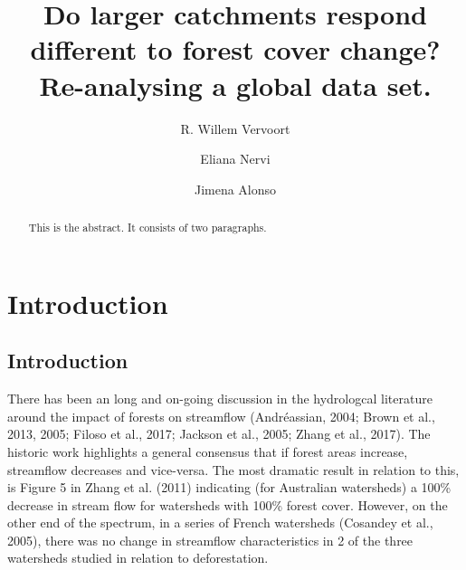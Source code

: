\documentclass[]{elsarticle} %
\begin{document}
\begin{frontmatter}

  \title{Do larger catchments respond different to forest cover change?
Re-analysing a global data set.}
    \author[The University of Sydney, INIA]{R. Willem Vervoort}
    \author[INIA]{Eliana Nervi}
    \author[IMFIA]{Jimena Alonso}
      \address[The University of Sydney]{School of Life and Environmental Sciences, The University of Sydney,
Sydney, NSW 2006, Australia}
    \address[INIA]{Instituto Nacional de Investigación Agropecuaria, INIA-Uruguay, Ruta 48
km 10, Rincon del Colorado, 90100 Canelones, Uruguay}
    \address[IMFIA]{Institute of Fluid Mechanics and Environmental Engineering, School of
Engineering, Universidad de la República, 11200 Montevideo, Uruguay}
  
  \begin{abstract}
  This is the abstract. It consists of two paragraphs.
  \end{abstract}
  
 \end{frontmatter}

\hypertarget{introduction}{%
\section{Introduction}\label{introduction}}

\hypertarget{introduction-1}{%
\subsection{Introduction}\label{introduction-1}}

There has been an long and on-going discussion in the hydrologcal
literature around the impact of forests on streamflow (Andréassian,
2004; Brown et al., 2013, 2005; Filoso et al., 2017; Jackson et al.,
2005; Zhang et al., 2017). The historic work highlights a general
consensus that if forest areas increase, streamflow decreases and
vice-versa. The most dramatic result in relation to this, is Figure 5 in
Zhang et al. (2011) indicating (for Australian watersheds) a 100\%
decrease in stream flow for watersheds with 100\% forest cover. However,
on the other end of the spectrum, in a series of French watersheds
(Cosandey et al., 2005), there was no change in streamflow
characteristics in 2 of the three watersheds studied in relation to
deforestation.
\end{document}
